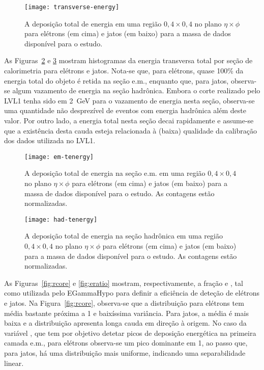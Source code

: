 \begin{figure}
\begin{center}
\texttt{[image: transverse-energy]}
\end{center}
\caption{A deposição total de energia em uma região $0,4 \times 0,4$ no plano
$\eta\times\phi$ para elétrons (em cima) e jatos (em baixo) para a massa de
dados disponível para o estudo.}
\label{fig:transverse-energy}
\end{figure}

As Figuras~\ref{fig:em-tenergy} e \ref{fig:had-tenergy} mostram histogramas da
energia transversa total por seção de calorimetria para e\-lé\-trons e
jatos. Nota-se que, para elétrons, quase 100\% da energia total do objeto é
retida na seção e.m., enquanto que, para jatos, observa-se algum vazamento de
energia na seção hadrônica. Embora o corte realizado pelo LVL1 tenha sido em
2~GeV para o vazamento de energia nesta seção, observa-se uma quantidade não
desprezível de eventos com energia hadrônica além deste valor. Por outro lado,
a energia total nesta seção decai rapidamente e assume-se que a existência
desta cauda esteja relacionada à (baixa) qualidade da calibração dos dados
utilizada no LVL1.

\begin{figure}
\begin{center}
\texttt{[image: em-tenergy]}
\end{center}
\caption{A deposição total de energia na seção e.m. em uma região $0,4 \times
0,4$ no plano $\eta\times\phi$ para elétrons (em cima) e jatos (em baixo) para
a massa de dados disponível para o estudo. As contagens estão normalizadas.}
\label{fig:em-tenergy}
\end{figure}

\begin{figure}
\begin{center}
\texttt{[image: had-tenergy]}
\end{center}
\caption{A deposição total de energia na seção hadrônica em uma região $0,4 \times
0,4$ no plano $\eta\times\phi$ para elétrons (em cima) e jatos (em baixo) para
a massa de dados disponível para o estudo. As contagens estão normalizadas.}
\label{fig:had-tenergy}
\end{figure}

As Figuras~\ref{fig:rcore} e \ref{fig:eratio} mostram, respectivamente, a
fração \rcore e \eratio, tal como utilizada pelo EGammaHypo para definir a
eficiência de deteção de elétrons e jatos. Na Figura~\ref{fig:rcore},
observa-se que a distribuição para elétrons tem média bastante próxima a 1 e
baixíssima variância. Para jatos, a média é mais baixa e a distribuição
apresenta longa cauda em direção à origem. No caso da variável \eratio, que
tem por objetivo detetar picos de deposição energética na primeira camada
e.m., para elétrons observa-se um pico dominante em 1, ao passo que, para
jatos, há uma distribuição mais uniforme, indicando uma separabilidade
linear.

